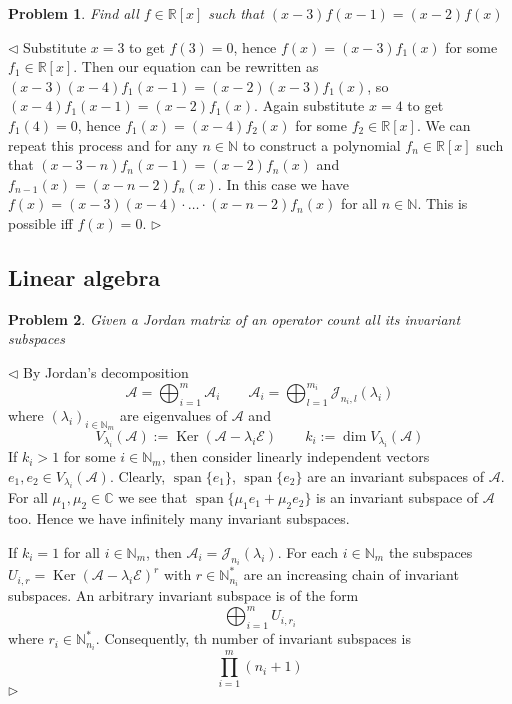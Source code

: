 \documentclass[12pt]{article}
\newtheorem{problem}{Problem}[subsection]
\newenvironment{solution}{\par $\triangleleft$}{$\triangleright$}
\begin{document}
\begin{problem} Find all $f\in \mathbb{R}[x]$ such that $(x-3)f(x-1)=(x-2)f(x)$
\end{problem}
\begin{solution} Substitute $x=3$ to get $f(3)=0$, hence $f(x)=(x-3)f_1(x)$ for some $f_1\in\mathbb{R}[x]$. Then our equation can be rewritten as $(x-3)(x-4)f_1(x-1)=(x-2)(x-3)f_1(x)$, so $(x-4)f_1(x-1)=(x-2)f_1(x)$. Again substitute $x=4$ to get $f_1(4)=0$, hence $f_1(x)=(x-4)f_2(x)$ for some $f_2\in\mathbb{R}[x]$. We can repeat this process and for any $n\in\mathbb{N}$ to construct a polynomial $f_n\in\mathbb{R}[x]$ such that $(x-3-n)f_n(x-1)=(x-2)f_n(x)$ and $f_{n-1}(x)=(x-n-2)f_{n}(x)$. In this case we have $f(x)=(x-3)(x-4)\cdot\ldots\cdot(x-n-2)f_n(x)$ for all $n\in\mathbb{N}$. This is possible iff $f(x)=0$.
\end{solution}
 
 
 
 
 
 
 
 
 
 
 
 
 
 
 
 
 
 
 
 
 
\newpage
 
\subsection{Linear algebra}
 
\begin{problem} Given a Jordan matrix of an operator count all its invariant subspaces
\end{problem}
\begin{solution} By Jordan's decomposition 
$$
\mathcal{A}=\bigoplus_{i=1}^m \mathcal{A}_i\qquad
\mathcal{A}_i=\bigoplus_{l=1}^{m_i} \mathcal{J}_{n_i,l}(\lambda_i)
$$
where $(\lambda_i)_{i\in\mathbb{N}_m}$ are eigenvalues of $\mathcal{A}$ and
$$
V_{\lambda_i}(\mathcal{A}):=\operatorname{Ker}(\mathcal{A}-\lambda_i\mathcal{E})\qquad
k_i:=\operatorname{dim} V_{\lambda_i}(\mathcal{A})
$$
If $k_i>1$ for some $i\in\mathbb{N}_m$, then consider linearly independent vectors $e_1,e_2\in V_{\lambda_i}(\mathcal{A})$. Clearly, $\operatorname{span}\{e_1\}$, $\operatorname{span}\{e_2\}$ are an invariant subspaces of $\mathcal{A}$. For all $\mu_1,\mu_2\in\mathbb{C}$ we see that $\operatorname{span}\{\mu_1e_1+\mu_2e_2\}$ is an invariant subspace of $\mathcal{A}$ too. Hence we have infinitely many invariant subspaces.
 
If $k_i=1$ for all $i\in\mathbb{N}_m$, then $\mathcal{A}_i=\mathcal{J}_{n_i}(\lambda_i)$. For each $i\in\mathbb{N}_m$ the subspaces $U_{i,r}=\operatorname{Ker}(\mathcal{A}-\lambda_i\mathcal{E})^r$ with $r\in\mathbb{N}_{n_i}^*$ are an increasing chain of invariant subspaces. An arbitrary invariant subspace is of the form 
$$
\bigoplus_{i=1}^m U_{i,r_i}
$$
where $r_i\in\mathbb{N}_{n_i}^*$. Consequently, th number of invariant subspaces is
$$
\prod_{i=1}^m(n_i+1)
$$
\end{solution}
 
\end{document}
